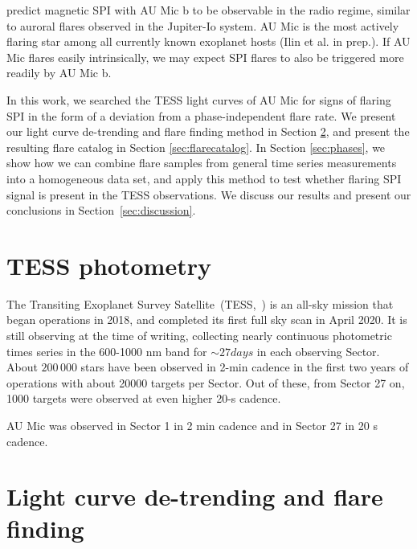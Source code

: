 \documentclass[fleqn,usenatbib,letters]{mnras}%
\begin{document}
\citet{kavanagh2021} predict magnetic SPI with AU Mic b to be observable in the radio regime, similar to auroral flares observed in the Jupiter-Io system. AU Mic is the most actively flaring star among all currently known exoplanet hosts (Ilin et al. in prep.). If AU Mic flares easily intrinsically, we may expect SPI flares to also be triggered more readily by AU Mic b. 

In this work, we searched the TESS light curves of AU Mic for signs of flaring SPI in the form of a deviation from a phase-independent flare rate. We present our light curve de-trending and flare finding method in Section \ref{sec:detrendfind}, and present the resulting flare catalog in Section \ref{sec:flarecatalog}. In Section \ref{sec:phases}, we show how we can combine flare samples from general time series measurements into a homogeneous data set, and apply this method to test whether flaring SPI signal is present in the TESS observations. We discuss our results and present our conclusions in Section~\ref{sec:discussion}.


\section{TESS photometry}
The Transiting Exoplanet Survey Satellite~(TESS,~\citealt{ricker2014}) is an all-sky mission that began operations in 2018, and completed its first full sky scan in April 2020. It is still observing at the time of writing, collecting nearly continuous photometric times series in the 600-1000 nm band for $\sim 27 days$ in each observing Sector. About $200\,000$ stars have been observed in 2-min cadence in the first two years of operations with about 20000 targets per Sector. Out of these, from Sector 27 on, 1000 targets were observed at even higher 20-s cadence.

AU Mic was observed in Sector 1 in 2 min cadence and in Sector 27 in 20 s cadence. 


\section{Light curve de-trending and flare finding}
\label{sec:detrendfind}
\end{document}
